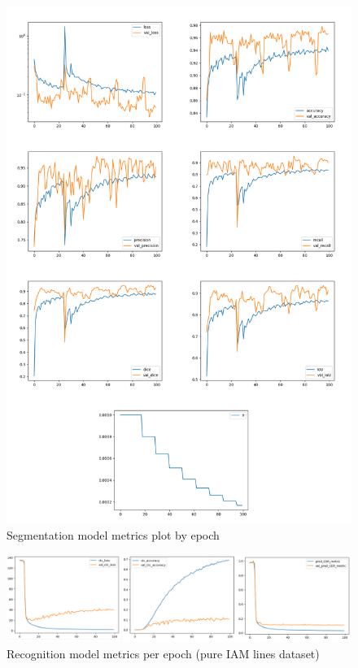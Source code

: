 \begin{figure}[htbp]
    \centering
        \includegraphics[scale=0.45]{figures/segtrain_results.png}
    \caption{Segmentation model metrics plot by epoch}    
    \label{FigSegMetrics}
\end{figure}


\begin{figure}[htbp]
    \centering
        \includegraphics[scale=0.35]{figures/metrics_recog.png}
    \caption{Recognition model metrics per epoch (pure IAM lines dataset)}    
    \label{FigRecMetrics}
\end{figure}

